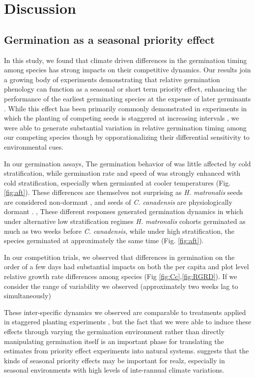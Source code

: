 \documentclass{article}\usepackage[]{graphicx}\usepackage[]{color}
\begin{document}
\section*{Discussion}
\subsection*{Germination as a seasonal priority effect} 
In this study, we found that climate driven differences in the germination timing among species has strong impacts on their competitive dynamics. Our results join a growing body of experiments demonstrating that relative germination phenology can function as a seasonal or short term priority effect, enhancing the performance of the earliest germinating species at the expense of later germinants \citep{}. While this effect has been primarily commonly demonstrated in experiments in which the planting of competing seeds is staggered at increasing intervals \citep{}, we were able to generate substantial variation in relative germination timing among our competing species though by opporationalizing their differential sensitivity to environmental cues. 

In our germination assays, The germination behavior of  was little affected by cold stratification, while germination rate and speed of  was strongly enhanced with cold stratification, especially when germianted at cooler temperatures (Fig. \ref{fig:aft}). These differences are themselves not surprising as \textit{H. matronalis} seeds are considered non-dormant \citep{}, and seeds of \textit{C. canadensis} are physiologically dormant \citep{}. , These different responses generated germination dynamics in which under alternative low stratification regimes \textit{H. matronalis} cohorts germinated as much as two weeks before \textit{C. canadensis}, while under high stratification, the species germinated at approximately the same time (Fig. \ref{fig:aft}). 

In our competition trials, we observed that differences in germination on the order of a few days had substantial impacts on both the per capita and plot level relative growth rate differences among species (Fig \ref{fig:Cc},\ref{fig:RGRD}). If we consider the range of variability we observed (approximately two weeks lag to simultaneously)

These inter-specific dynamics we observed are comparable to treatments applied in staggered planting experiments \citep{}, but the fact that we were able to induce these effects through varying the germination environment rather than directly manipulating germination itself is an important phase for translating the estimates from priority effect experiments into natural systems.  suggests that the kinds of seasonal priority effects may be important for realz, especially in seasonal environments with high levels of inte-rannual climate variations.
\end{document}
